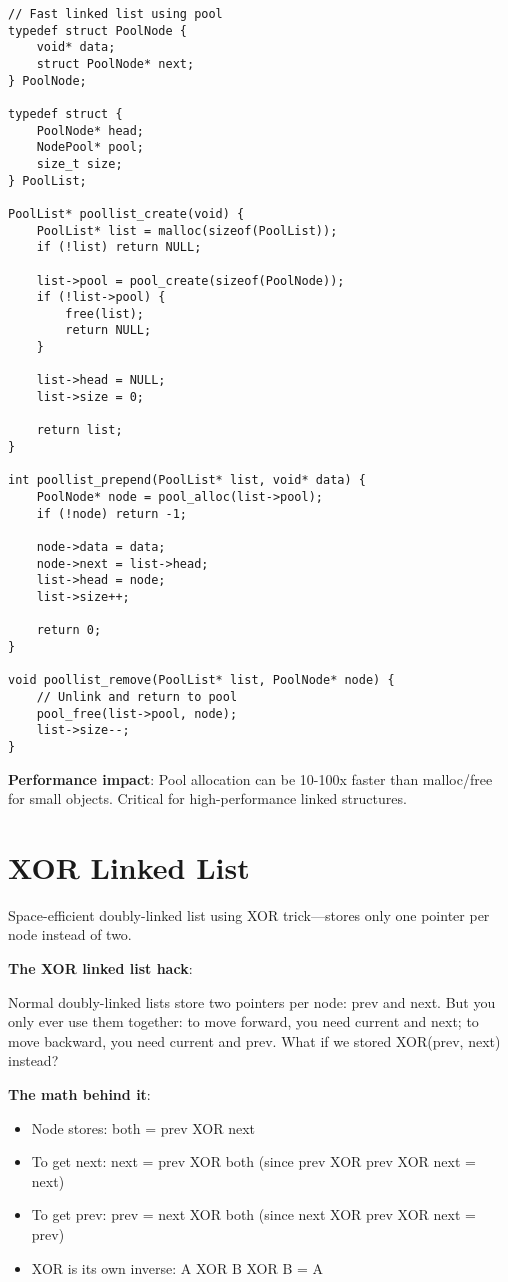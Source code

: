 \begin{lstlisting}
// Fast linked list using pool
typedef struct PoolNode {
    void* data;
    struct PoolNode* next;
} PoolNode;

typedef struct {
    PoolNode* head;
    NodePool* pool;
    size_t size;
} PoolList;

PoolList* poollist_create(void) {
    PoolList* list = malloc(sizeof(PoolList));
    if (!list) return NULL;

    list->pool = pool_create(sizeof(PoolNode));
    if (!list->pool) {
        free(list);
        return NULL;
    }

    list->head = NULL;
    list->size = 0;

    return list;
}

int poollist_prepend(PoolList* list, void* data) {
    PoolNode* node = pool_alloc(list->pool);
    if (!node) return -1;

    node->data = data;
    node->next = list->head;
    list->head = node;
    list->size++;

    return 0;
}

void poollist_remove(PoolList* list, PoolNode* node) {
    // Unlink and return to pool
    pool_free(list->pool, node);
    list->size--;
}
\end{lstlisting}

\textbf{Performance impact}: Pool allocation can be 10-100x faster than malloc/free for small objects. Critical for high-performance linked structures.

\section{XOR Linked List}

Space-efficient doubly-linked list using XOR trick—stores only one pointer per node instead of two.

\textbf{The XOR linked list hack}:

Normal doubly-linked lists store two pointers per node: prev and next. But you only ever use them together: to move forward, you need current and next; to move backward, you need current and prev. What if we stored XOR(prev, next) instead?

\textbf{The math behind it}:
\begin{itemize}
    \item Node stores: both = prev XOR next
    \item To get next: next = prev XOR both (since prev XOR prev XOR next = next)
    \item To get prev: prev = next XOR both (since next XOR prev XOR next = prev)
    \item XOR is its own inverse: A XOR B XOR B = A
\end{itemize}

